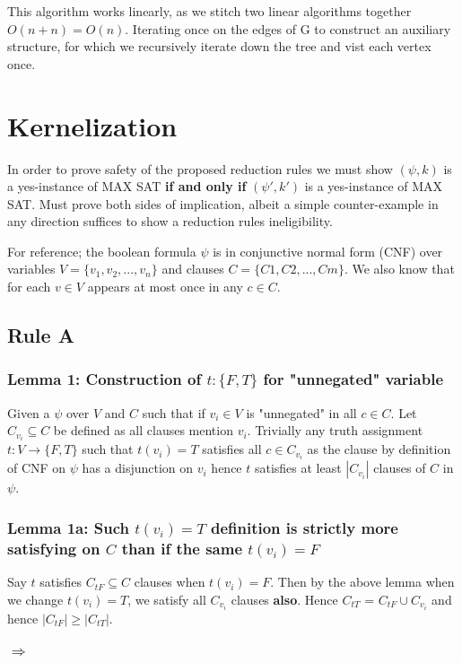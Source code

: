 \documentclass{article}
\begin{document}
This algorithm works linearly, as we stitch two linear algorithms together $O(n + n)=O(n)$. Iterating once on the edges of G to construct an auxiliary structure, for which we recursively iterate down the tree and vist each vertex once.

\section*{Kernelization}
In order to prove safety of the proposed reduction rules we must show $(\psi, k)$ is a yes-instance of MAX SAT {\bf if and only if} $(\psi', k')$ is a yes-instance of MAX SAT. Must prove both sides of implication, albeit a simple counter-example in any direction suffices to show a reduction rules ineligibility.

For reference; the boolean formula $\psi$ is in conjunctive normal form (CNF) over variables $V = \{v_1, v_2, ... , v_n\}$ and clauses $C = \{C1, C2, ... , Cm\}$. We also know that for each $v \in V$ appears at most once in any $c \in C$.

\subsection*{Rule A}
\subsubsection*{Lemma 1: Construction of $t: \{F,T\}$ for "unnegated" variable}
Given a $\psi$ over $V$ and $C$ such that if $v_i \in V$ is "unnegated" in all $c \in C$. Let $C_{v_i} \subseteq C$ be defined as all clauses mention $v_i$. Trivially any truth assignment $t: V \rightarrow \{F,T\}$ such that $t(v_i) = T$ satisfies all $c \in C_{v_i}$ as the clause by definition of CNF on $\psi$ has a disjunction on $v_i$ hence $t$ satisfies at least $|C_{v_i}|$ clauses of $C$ in $\psi$.

\subsubsection*{Lemma 1a: Such $t(v_i) = T$ definition is strictly more satisfying on $C$ than if the same $t(v_i) = F$}
Say $t$ satisfies $C_{tF} \subseteq C$ clauses when $t(v_i) = F$. Then by the above lemma when we change $t(v_i)=T$, we satisfy all $C_{v_i}$ clauses {\bf also}. Hence $C_{tT}$ = $C_{tF} \cup C_{v_i}$ and hence $|C_{tF}| \geq |C_{tT}|$.

\subsubsection*{$\Rightarrow$}
\end{document}
